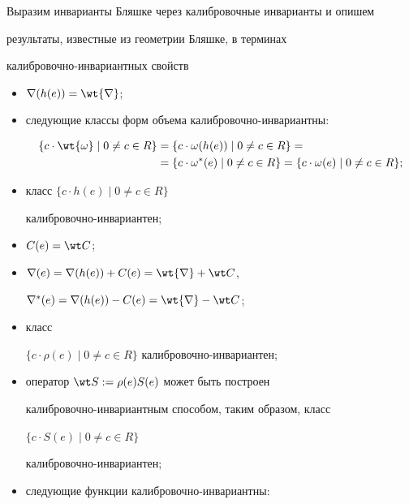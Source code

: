 Выразим инварианты Бляшке через калибровочные инварианты и опишем

результаты, известные из геометрии Бляшке, в терминах

калибровочно-инвариантных свойств

\begin{itemize}

\item[(i)] $\nabla (h(e)) = \wt {\nabla}$;

\item[(ii)] следующие классы форм объема калибровочно-инвариантны:

\begin{align*}

\{ c \cdot \wt {\omega} \mid 0 \neq c \in R \} & =

\{ c \cdot \omega (h(e)) \mid 0 \neq c \in R \}= \\

& =\{ c \cdot \omega^* (e) \mid 0 \neq c \in R\}

= \{ c \cdot \omega (e) \mid 0 \neq c \in R \};

\end{align*}

\item[(iii)] класс $\{ c \cdot h(e) \mid 0 \neq c \in R \}$

калибровочно-инвариантен;

\item[(iv)] $C(e) = \wt C$;

\item[(v)]

$\nabla (e) =\nabla (h(e)) + C(e) = \wt {\nabla} + \wt C$,

$\nabla^* (e) =\nabla (h(e)) - C(e) = \wt {\nabla} - \wt C$;

\item[(vi)] класс

$\{ c \cdot \rho (e) \mid 0 \neq c \in R \}$ калибровочно-инвариантен;

\item[(vii)] оператор $\wt S := \rho (e) S(e)$ может быть построен

калибровочно-инвариантным способом, таким образом, класс

$\{ c \cdot S(e) \mid 0 \neq c \in R \}$

калибровочно-инвариантен;

\item[(viii)] следующие функции калибровочно-инвариантны:

$$


\end{itemize}
